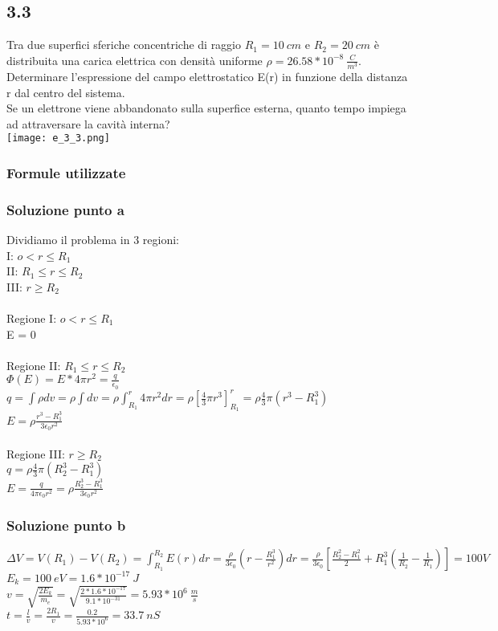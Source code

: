 \documentclass[../../main.tex]{subfiles}
\begin{document}
\subsection*{3.3}
Tra due superfici sferiche concentriche di raggio $R_1 = 10\ cm$ e $R_2 = 20\ cm$ è distribuita una carica elettrica con densità uniforme $\rho = 26.58 * 10^{-8}\ \frac{C}{m^3}$.
\\Determinare l'espressione del campo elettrostatico E(r) in funzione della distanza r dal centro del sistema.
\\Se un elettrone viene abbandonato sulla superfice esterna, quanto tempo impiega ad attraversare la cavità interna?
\\\texttt{[image: e\_3\_3.png]}
\subsubsection*{Formule utilizzate}
\subsubsection*{Soluzione punto a}
Dividiamo il problema in 3 regioni:
\\I: $o<r \le R_1$
\\II: $R_1 \le r \le R_2$
\\III: $r \ge R_2$
\\\\Regione I: $o<r \le R_1$
\\E = 0
\\\\Regione II: $R_1 \le r \le R_2$
\\$\Phi(E) = E * 4\pi r^2 = \frac{q}{\epsilon_0}$
\\$q = \int\rho dv = \rho\int dv = \rho\int_{R_1}^r 4\pi r^2dr = \rho\left[\frac{4}{3}\pi r^3\right]_{R_1}^r =\rho\frac{4}{3}\pi(r^3 - R_1^3)$
\\$E= \rho \frac{r^3-R_1^3}{3\epsilon_0 r^2}$
\\\\Regione III: $r \ge R_2$
\\$q = \rho\frac{4}{3}\pi(R_2^3-R_1^3)$
\\$E=\frac{q}{4\pi \epsilon_0 r^2} = \rho\frac{R_2^3 -R_1^3}{3\epsilon_0 r^2}$  
\subsubsection*{Soluzione punto b}
$\Delta V= V(R_1) - V(R_2) = \int_{R_1}^{R_2} E(r)dr = \frac{\rho}{3\epsilon_0}(r- \frac{R_1^3}{r^2})dr = \frac{\rho}{3\epsilon_0}\left[\frac{R_2^2 - R_1^2}{2} + R_1^3\left(\frac{1}{R_2} - \frac{1}{R_1}\right)\right] = 100V$
\\$E_k = 100\ eV = 1.6 * 10^{-17}\ J$
\\$v = \sqrt{\frac{2E_k}{m_e}} = \sqrt{\frac{2 * 1.6 * 10^{-17}}{9.1 * 10^{-31}}} = 5.93 * 10^6\ \frac{m}{s}$
\\$t = \frac{l}{v} = \frac{2R_1}{v} = \frac{0.2}{5.93 * 10^6} = 33.7\ nS$
\newpage
\end{document}
